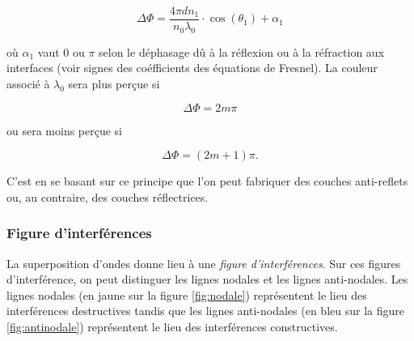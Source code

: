 $$\Delta \Phi = \frac{4\pi dn_1}{n_0\lambda_0}\cdot\cos(\theta_1) + \alpha_1$$

où $\alpha_1$ vaut 0 ou $\pi$ selon le déphasage dû à la
réflexion ou à la réfraction aux interfaces (voir signes
des coéfficients des équations de Fresnel).
La couleur associé à $\lambda_0$ sera plus perçue si

$$\Delta \Phi = 2m\pi$$

ou sera moins perçue si

$$\Delta \Phi = (2m+1)\pi.$$

C'est en se basant sur ce principe que l'on peut
fabriquer des couches anti-reflets ou, au contraire,
des couches réflectrices.

\subsubsection{Figure d'interférences}
La superposition d'ondes donne lieu à une \emph{figure
d'interférences}. Sur ces figures d'interférence, on
peut distinguer les lignes nodales et les lignes anti-nodales.
Les lignes nodales (en jaune sur la figure \ref{fig:nodale})
représentent le lieu des interférences destructives tandis que
les lignes anti-nodales (en bleu sur la figure \ref{fig:antinodale})
représentent le lieu des interférences constructives.

